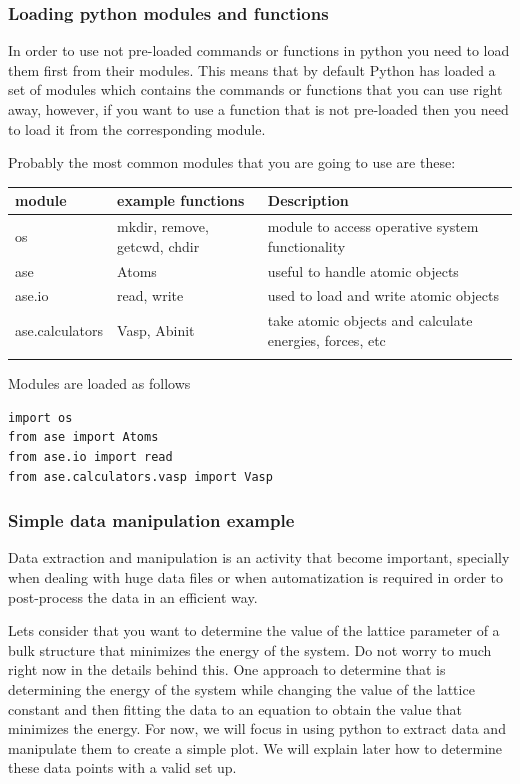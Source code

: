 \documentclass[11pt]{article}
\begin{document}
\subsubsection{Loading python modules and functions}
\label{sec:org5743d77}
In order to use not pre-loaded commands or functions in python you need to load them first from their modules. This means that by default Python has loaded a set of modules which contains the commands or functions that you can use right away, however, if you want to use a function that is not pre-loaded then you need to load it from the corresponding module. 

Probably the most common modules that you are going to use are these:
\begin{center}
\begin{tabular}{lll}
module & example functions & Description\\
\hline
os & mkdir, remove, getcwd, chdir & module to access operative system functionality\\
ase & Atoms & useful to handle atomic objects\\
ase.io & read, write & used to load and write atomic objects\\
ase.calculators & Vasp, Abinit & take atomic objects and calculate energies, forces, etc\\
 &  & \\
\end{tabular}
\end{center}

Modules are loaded as follows
\begin{verbatim}
import os
from ase import Atoms
from ase.io import read
from ase.calculators.vasp import Vasp
\end{verbatim}

\subsubsection{Simple data manipulation example}
\label{sec:org70ff2a4}
Data extraction and manipulation is an activity that become important, specially when dealing with huge data files or when automatization is required in order to post-process the data in an efficient way.

Lets consider that you want to determine the value of the lattice parameter of a bulk structure that minimizes the energy of the system. Do not worry to much right now in the details behind this. One approach to determine that is determining the energy of the system while changing the value of the lattice constant and then fitting the data to an equation to obtain the value that minimizes the energy. For now, we will focus in using python to extract data and manipulate them to create a simple plot. We will explain later how to determine these data points with a valid set up.
\end{document}
